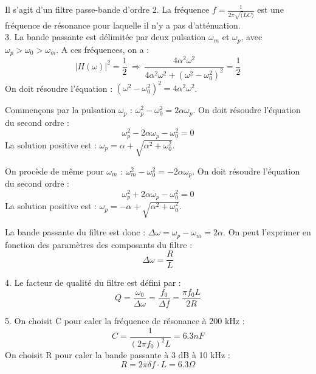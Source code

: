 \documentclass[11pt]{report}
\begin{document}
	Il s'agit d'un filtre passe-bande d'ordre 2. La fréquence $f=\frac{1}{2\pi \sqrt(LC)}$ est une fréquence de résonance pour laquelle il n'y a pas d'atténuation.\\
	
	3. La bande passante est délimitée par deux pulsation $\omega_{m}$ et $\omega_{p}$, avec $\omega_{p} > \omega_{0} > \omega_{m}$. A ces fréquences, on a :
	\begin{equation*}
	|H(\omega)|^{2}=\frac{1}{2}~\Rightarrow~\frac{4\alpha^{2} \omega^{2}}{4\alpha^{2} \omega^{2}+(\omega^{2}-\omega_{0}^{2})^{2}}=\frac{1}{2}
	\end{equation*}
	On doit résoudre l'équation : $(\omega^{2}-\omega_{0}^{2})^{2}=4\alpha^{2} \omega^{2}$.
	
	Commençons par la pulsation $\omega_{p}$ : $\omega_{p}^{2}-\omega_{0}^{2}=2\alpha \omega_{p}$. On doit résoudre l'équation du second ordre :
	\begin{equation*}
	\omega_{p}^{2}-2\alpha \omega_{p}-\omega_{0}^{2}=0
	\end{equation*}
	La solution positive est : $\omega_{p} = \alpha+\sqrt{\alpha^{2}+\omega_{0}^{2}}$.
	
	On procède de même pour $\omega_{m}$ : $\omega_{m}^{2}-\omega_{0}^{2}=-2\alpha \omega_{p}$. On doit résoudre l'équation du second ordre :
	\begin{equation*}
	\omega_{p}^{2}+2\alpha \omega_{p}-\omega_{0}^{2}=0
	\end{equation*}
	La solution positive est : $\omega_{p} = -\alpha+\sqrt{\alpha^{2}+\omega_{0}^{2}}$.
	
	La bande passante du filtre est donc : $\Delta \omega = \omega_{p}-\omega_{m}=2\alpha$.
	On peut l'exprimer en fonction des paramètres des composants du filtre : 
	\begin{equation*}
	\Delta \omega = \frac{R}{L}
	\end{equation*}
	
	4. Le facteur de qualité du filtre est défini par :
	\begin{equation*}
	Q=\frac{\omega_{0}}{\Delta \omega}=\frac{f_{0}}{\Delta f}=\frac{\pi f_{0}L}{2R}
	\end{equation*}
	
	5. On choisit C pour caler la fréquence de résonance à 200 kHz :
	\begin{equation*}
	C=\frac{1}{(2\pi f_{0})^{2}L}=6.3 nF
	\end{equation*}
	On choisit R pour caler la bande passante à 3 dB à 10 kHz :
	\begin{equation*}
	R=2\pi \delta f\cdot L=6.3\Omega
	\end{equation*}
	
\end{document}
